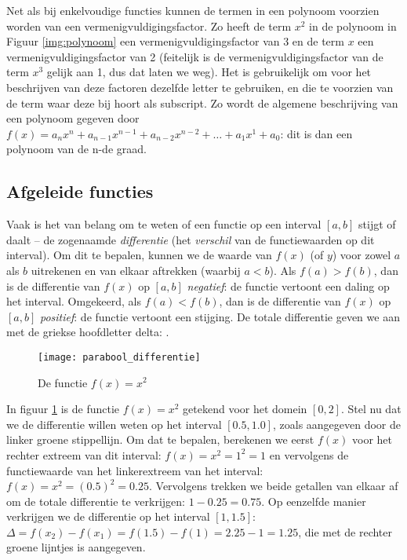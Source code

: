 Net als bij enkelvoudige functies kunnen de termen in een polynoom voorzien worden van een vermenigvuldigingsfactor. Zo heeft de term $x^2$ in de polynoom in Figuur \ref{img:polynoom} een vermenigvuldigingsfactor van 3 en de term $x$ een vermenigvuldigingsfactor van 2 (feitelijk is de vermenigvuldigingsfactor van de term $x^3$ gelijk aan 1, dus dat laten we weg). Het is gebruikelijk om voor het beschrijven van deze factoren dezelfde letter te gebruiken, en die te voorzien van de term waar deze bij hoort als subscript. Zo wordt de algemene beschrijving van een polynoom gegeven door $f(x) = a_nx^n + a_{n-1}x^{n-1} + a_{n-2}x^{n-2}+ \dots + a_1x^1+a_0$: dit is dan een polynoom van de n-de graad.


\subsection{Afgeleide functies}

Vaak is het van belang om te weten of een functie op een interval $\left[a,b\right]$ stijgt of daalt – de zogenaamde \textit{differentie} (het \textit{verschil} van de functiewaarden op dit interval). Om dit te bepalen, kunnen we de waarde van $f(x)$ (of $y$) voor zowel $a$ als $b$ uitrekenen en van elkaar aftrekken (waarbij $a<b$). Als $f(a) > f(b)$, dan is de differentie van $f(x)$ op $\left[a,b\right]$ \textit{negatief}: de functie vertoont een daling op het interval. Omgekeerd, als $f(a) < f(b)$, dan is de differentie van $f(x)$ op $\left[a,b\right]$ \textit{positief}: de functie vertoont een stijging. De totale differentie geven we aan met de griekse hoofdletter delta: \Delta.

\begin{figure}[h]
    \centering
    \texttt{[image: parabool\_differentie]}
    \caption{De functie $f(x) = x^2$\label{img:parabool_differentie}}
\end{figure}

In figuur \ref{img:parabool_differentie} is de functie $f(x)=x^2$ getekend voor het domein $\left[0,2\right]$. Stel nu dat we de differentie willen weten op het interval $\left[0.5, 1.0\right]$, zoals aangegeven door de linker groene stippellijn. Om dat te bepalen, berekenen we eerst $f(x)$ voor het rechter extreem van dit interval: $f(x) = x^2 = 1^2 = 1$ en vervolgens de functiewaarde van het linkerextreem van het interval: $f(x) = x^2 = (0.5)^2 = 0.25$. Vervolgens trekken we beide getallen van elkaar af om de totale differentie te verkrijgen: $1-0.25=0.75$. Op eenzelfde manier verkrijgen we de differentie op het interval $\left[1, 1.5\right]$: $\Delta = f(x_2) - f(x_1) = f(1.5)-f(1) = 2.25-1 = 1.25$, die met de rechter groene lijntjes is aangegeven.

